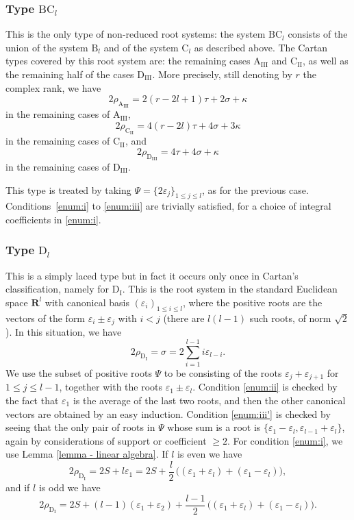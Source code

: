 \documentclass[JEP,XML,SOM,Unicode,published]{cedram}
\newcommand{\rB}{\mathrm{B}}
\newcommand{\rD}{\mathrm{D}}
\newcommand{\rI}{\mathrm{I}}
\newcommand{\RR}{\mathbf{R}}
\theoremstyle{plain}
\theoremstyle{remark}
\theoremstyle{definition}
\begin{document}
\subsubsection*{Type $\mathrm{BC}_l$
\cite[Chap.\,VI.14, p.\,222]{BBK-Lie-4to6}}
This is the only type of non-reduced root systems: the system $\mathrm{BC}_l$ consists of the union of the system $\rB_l$ and of the system $\mathrm{C}_l$ as described above.
The Cartan types covered by this root system are: the remaining cases $\mathrm{A}_\mathrm{III}$ and $\mathrm{C}_\mathrm{II}$, as well as the remaining half of the cases $\rD_\mathrm{III}$.
More precisely, still denoting by $r$ the complex rank, we have
\[
2 \rho_{\mathrm{A}_\mathrm{III}} = 2(r-2l+1)\tau+ 2 \sigma+ \kappa
\]
in the remaining cases of $\mathrm{A}_\mathrm{III}$,
\[
2 \rho_{\mathrm{C}_\mathrm{II}} = 4(r-2l) \tau+ 4 \sigma+ 3 \kappa
\]
in the remaining cases of $\mathrm{C}_\mathrm{II}$, and
\[
2 \rho_{\rD_\mathrm{III}} = 4 \tau + 4 \sigma+ \kappa
\]
in the remaining cases of $\rD_\mathrm{III}$.

This type is treated by taking $\Psi = \{2 \varepsilon_j \}_{1 \leqslant j \leqslant l}$, as for the previous case.
Conditions~\eqref{enum:i} to \eqref{enum:iii} are trivially satisfied, for a choice of integral coefficients in \eqref{enum:i}.

\subsubsection*{Type $\rD_l$
\cite[Planche IV, p.\,256]{BBK-Lie-4to6}}
This is a simply laced type but in fact it occurs only once in Cartan's classification, namely for $\rD_\rI$.
This is the root system in the standard Euclidean space $\RR^l$ with canonical basis $(\varepsilon_i)_{1 \leqslant i \leqslant l}$, where the positive roots are the vectors of the form $\varepsilon_i \pm \varepsilon_j$ with $i<j$ (there are $l(l-1)$ such roots, of norm $\sqrt{2}$).
In this situation, we have
\[
2 \rho_{\rD_\rI} = \sigma = 2 \sum_{i=1}^{l-1} i \varepsilon_{l-i}.
\]
We use the subset of positive roots $\Psi$ to be consisting of the roots $\varepsilon_{j} + \varepsilon_{j+1}$ for $1 \leqslant j \leqslant l-1$, together with the roots $\varepsilon_1 \pm \varepsilon_l$.
Condition \eqref{enum:ii} is checked by the fact that $\varepsilon_1$ is the average of the last two roots, and then the other canonical vectors are obtained by an easy induction.
Condition \eqref{enum:iii'} is checked by seeing that the only pair of roots in $\Psi$ whose sum is a root is $\{\varepsilon_1-\varepsilon_l , \varepsilon_{l-1}+\varepsilon_l \}$, again by considerations of support or coefficient $\geqslant 2$.
For condition \eqref{enum:i}, we use Lemma \ref{lemma - linear algebra}.
If $l$ is even we have
\[
2 \rho_{\rD_\rI} = 2 S + l \varepsilon_1 = 2 S + {\frac l2}\, \bigl((\varepsilon_1 + \varepsilon_l) + (\varepsilon_1 - \varepsilon_l) \bigr),
\]
and if $l$ is odd we have
\[
2 \rho_{\rD_\rI} = 2 S + (l-1)(\varepsilon_1 + \varepsilon_2) + \frac{l-1}{2}\, \bigl((\varepsilon_1 + \varepsilon_l) + (\varepsilon_1 - \varepsilon_l) \bigr).
\]
\end{document}
